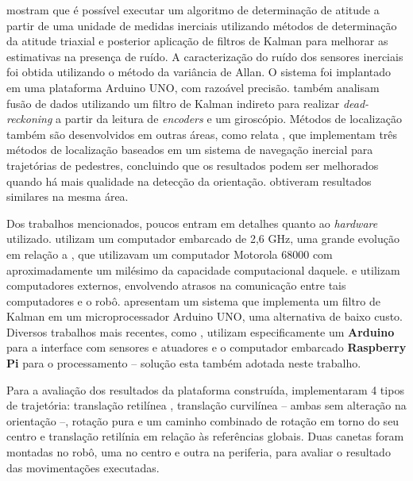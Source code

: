 \citet{lowcostIMU} mostram que é possível executar um algoritmo de determinação de atitude a partir de uma unidade de medidas inerciais utilizando métodos de determinação da atitude triaxial e posterior aplicação de filtros de Kalman para melhorar as estimativas na presença de ruído. A caracterização do ruído dos sensores inerciais foi obtida utilizando o método da variância de Allan. O sistema foi implantado em uma plataforma Arduino UNO, com razoável precisão. \citet{park1996dead} também analisam fusão de dados utilizando um filtro de Kalman indireto para realizar \emph{dead-reckoning} a partir da leitura de \emph{encoders} e um giroscópio. Métodos de localização também são desenvolvidos em outras áreas, como relata \citet{jimenez2009comparison}, que implementam três métodos de localização baseados em um sistema de navegação inercial para trajetórias de pedestres, concluindo que os resultados podem ser melhorados quando há mais qualidade na detecção da orientação. \citet{steinhoff2010pocket} obtiveram resultados similares na mesma área.

Dos trabalhos mencionados, poucos entram em detalhes quanto ao \emph{hardware} utilizado. \citet{oubbati2005velocity} utilizam um computador embarcado de 2,6 GHz, uma grande evolução em relação a \citet{feng1989servo}, que utilizavam um computador Motorola 68000 com aproximadamente um milésimo da capacidade computacional daquele. \citet{takemura2007development} e \citet{loh2003mechatronics} utilizam computadores externos, envolvendo atrasos na comunicação entre tais computadores e o robô. \citet{lowcostIMU} apresentam um sistema que implementa um filtro de Kalman em um microprocessador Arduino UNO, uma alternativa de baixo custo. Diversos trabalhos mais recentes, como \citet{krinkin2015design}, utilizam especificamente um \textbf{Arduino} para a interface com sensores e atuadores e o computador embarcado \textbf{Raspberry Pi} para o processamento -- solução esta também adotada neste trabalho.

Para a avaliação dos resultados da plataforma construída, \citet{loh2003mechatronics} implementaram 4 tipos de trajetória: translação retilínea , translação curvilínea -- ambas sem alteração na orientação --, rotação pura e um caminho combinado de rotação em torno do seu centro e translação retilínia em relação às referências globais. Duas canetas foram montadas no robô, uma no centro e outra na periferia, para avaliar o resultado das movimentações executadas.
